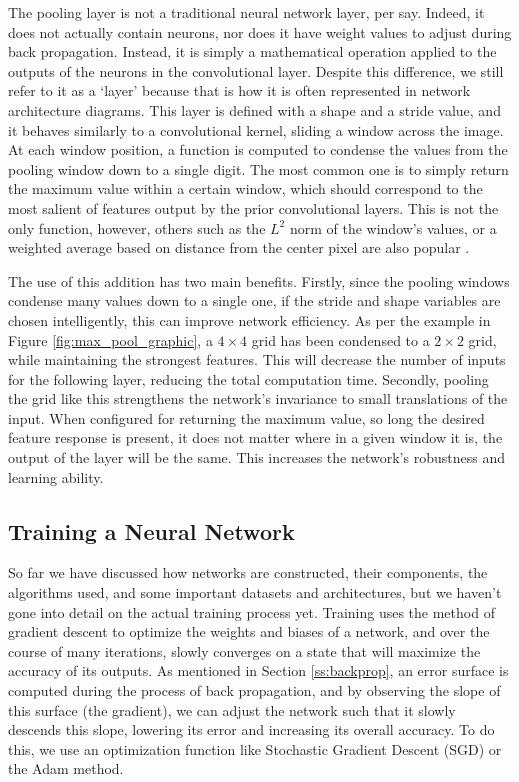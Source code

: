 \documentclass[11pt,a4paper,oldfontcommands]{memoir}
\begin{document}
The pooling layer is not a traditional neural network layer, per say. Indeed, it does not actually contain neurons, nor does it have weight values to adjust during back propagation. Instead, it is simply a mathematical operation applied to the outputs of the neurons in the convolutional layer. Despite this difference, we still refer to it as a `layer' because that is how it is often represented in network architecture diagrams. This layer is defined with a shape and a stride value, and it behaves similarly to a convolutional kernel, sliding a window across the image. At each window position, a function is computed to condense the values from the pooling window down to a single digit. The most common one is to simply return the maximum value within a certain window, which should correspond to the most salient of features output by the prior convolutional layers. This is not the only function, however, others such as the $L^2$ norm of the window's values, or a weighted average based on distance from the center pixel are also popular \cite{dl_book}. 

The use of this addition has two main benefits. Firstly, since the pooling windows condense many values down to a single one, if the stride and shape variables are chosen intelligently, this can improve network efficiency. As per the example in Figure \ref{fig:max_pool_graphic}, a $4\times4$ grid has been condensed to a $2\times2$ grid, while maintaining the strongest features. This will decrease the number of inputs for the following layer, reducing the total computation time. Secondly, pooling the grid like this strengthens the network's invariance to small translations of the input. When configured for returning the maximum value, so long the desired feature response is present, it does not matter where in a given window it is, the output of the layer will be the same. This increases the network's robustness and learning ability. 

\subsection{Training a Neural Network}
So far we have discussed how networks are constructed, their components, the algorithms used, and some important datasets and architectures, but we haven't gone into detail on the actual training process yet. Training uses the method of gradient descent to optimize the weights and biases of a network, and over the course of many iterations, slowly converges on a state that will maximize the accuracy of its outputs. As mentioned in Section \ref{ss:backprop}, an error surface is computed during the process of back propagation, and by observing the slope of this surface (the gradient), we can adjust the network such that it slowly descends this slope, lowering its error and increasing its overall accuracy. To do this, we use an optimization function like Stochastic Gradient Descent (SGD) or the Adam method. 
\end{document}
